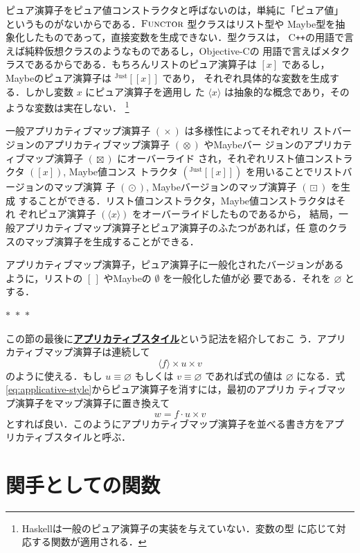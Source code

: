 \documentclass[a5paper,twoside,fleqn,draft]{jsbook}
\def\[{\left[\!\left[}
\def\]{\right]\!\right]}
\newcommand{\separator}{\begin{center}$*$~$*$~$*$\end{center}}
\newcommand{\programminglanguage}[1]{\textsf{#1}}
\newcommand{\cxx}{\programminglanguage{C}\texttt{++}}
\newcommand{\haskell}{\programminglanguage{Haskell}}
\newcommand{\objectivec}{\programminglanguage{Objective-C}}
\newcommand{\keyword}[1]{{\underline{\textbf{#1}}}}
\newcommand{\mEmptyList}{{[\,]}}
\newcommand{\mNothing}{\emptyset}
\newcommand{\mPureNothing}{\varnothing}
\DeclareMathOperator{\mAppMap}{\times}
\DeclareMathOperator{\mAppMapList}{\otimes}
\DeclareMathOperator{\mAppMapMaybe}{\boxtimes}
\DeclareMathOperator{\mMap}{\cdot} %
\DeclareMathOperator{\mMapList}{\odot}
\DeclareMathOperator{\mMapMaybe}{\boxdot}
\newcommand{\mValueConstructor}[1]{\mathrm{#1}}
\newcommand{\mGenericValueAssemble}[2]{{}^\mValueConstructor{#1}\[#2\]}
\newcommand{\mJustWith}[1]{\mGenericValueAssemble{Just}{#1}}
\newcommand{\mListWith}[1]{\left[#1\right]}
\newcommand{\mPureWith}[1]{\langle#1\rangle}
\newcommand{\mGenericTypeClass}[1]{\textsc{#1}} %
\newcommand{\mFunctorTypeClass}{\mGenericTypeClass{Functor}}
\begin{document}
ピュア演算子をピュア値コンストラクタと呼ばないのは，単純に「ピュア値」
というものがないからである．$\mFunctorTypeClass$ 型クラスはリスト型や
Maybe型を抽象化したものであって，直接変数を生成できない．型クラスは，
\cxx の用語で言えば純粋仮想クラスのようなものであるし，\objectivec の
用語で言えばメタクラスであるからである．もちろんリストのピュア演算子は
$\mListWith{x}$ であるし，Maybeのピュア演算子は $\mJustWith{x}$ であり，
それぞれ具体的な変数を生成する．しかし変数 $x$ にピュア演算子を適用し
た $\mPureWith{x}$ は抽象的な概念であり，そのような変数は実在しない．
\footnote{\haskell は一般のピュア演算子の実装を与えていない．変数の型
  に応じて対応する関数が適用される．}

一般アプリカティブマップ演算子 $(\mAppMap)$ は多様性によってそれぞれリ
ストバージョンのアプリカティブマップ演算子 $(\mAppMapList)$ やMaybeバー
ジョンのアプリカティブマップ演算子 $(\mAppMapMaybe)$ にオーバーライド
され，それぞれリスト値コンストラクタ $(\mListWith{x})$, Maybe値コンス
トラクタ $(\mJustWith{x})$ を用いることでリストバージョンのマップ演算
子 $(\mMapList)$, Maybeバージョンのマップ演算子 $(\mMapMaybe)$ を生成
することができる．リスト値コンストラクタ，Maybe値コンストラクタはそれ
ぞれピュア演算子 $(\mPureWith{x})$ をオーバーライドしたものであるから，
結局，一般アプリカティブマップ演算子とピュア演算子のふたつがあれば，任
意のクラスのマップ演算子を生成することができる．

アプリカティブマップ演算子，ピュア演算子に一般化されたバージョンがある
ように，リストの $\mEmptyList$ やMaybeの $\mNothing$ を一般化した値が必
要である．それを $\mPureNothing$ とする．

\separator

この節の最後に\keyword{アプリカティブスタイル}という記法を紹介しておこ
う．アプリカティブマップ演算子は連続して
\begin{equation}
\label{eq:applicative-style}
\mPureWith{f}\mAppMap u\mAppMap v
\end{equation}
のように使える．もし $u\equiv\mPureNothing$ もしくは
$v\equiv\mPureNothing$ であれば式の値は $\mPureNothing$ になる．式
\eqref{eq:applicative-style}からピュア演算子を消すには，最初のアプリカ
ティブマップ演算子をマップ演算子に置き換えて
\begin{equation}
w=f\mMap u\mAppMap v
\end{equation}
とすれば良い．このようにアプリカティブマップ演算子を並べる書き方をアプ
リカティブスタイルと呼ぶ．

\section{関手としての関数}
\end{document}
